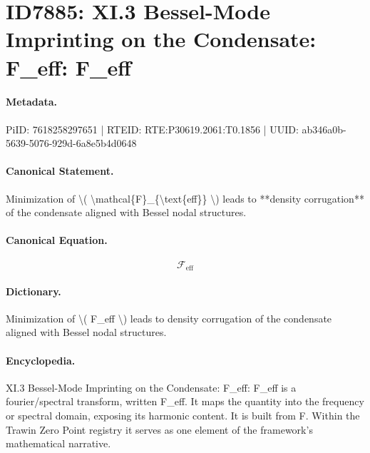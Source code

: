 \section*{ID7885: XI.3 Bessel-Mode Imprinting on the Condensate: F\_eff: F\_eff}
\paragraph{Metadata.}
PiID: 7618258297651 | RTEID: RTE:P30619.2061:T0.1856 | UUID: ab346a0b-5639-5076-929d-6a8e5b4d0648

\paragraph{Canonical Statement.}
Minimization of \textbackslash{}( \textbackslash{}mathcal\{F\}\_\{\textbackslash{}text\{eff\}\} \textbackslash{}) leads to **density corrugation** of the condensate aligned with Bessel nodal structures.

\paragraph{Canonical Equation.}
\[
\mathcal{F}_{\text{eff}}
\]

\paragraph{Dictionary.}
Minimization of \textbackslash{}( F\_eff \textbackslash{}) leads to density corrugation of the condensate aligned with Bessel nodal structures.

\paragraph{Encyclopedia.}
XI.3 Bessel-Mode Imprinting on the Condensate: F\_eff: F\_eff is a fourier/spectral transform, written F\_eff. It maps the quantity into the frequency or spectral domain, exposing its harmonic content. It is built from F. Within the Trawin Zero Point registry it serves as one element of the framework's mathematical narrative.
